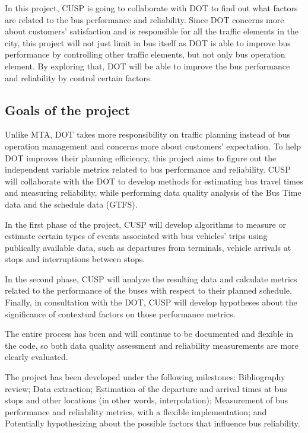 \documentclass[12pt]{report}
\begin{document}
In this project, CUSP is going to collaborate with DOT to find out what factors are related to the bus performance and reliability. Since DOT concerns more about customers' satisfaction and is responsible for all the traffic elements in the city, this project will not just limit in bus itself as DOT is able to improve bus performance by controlling other traffic elements, but not only bus operation element. By exploring that, DOT will be able to improve the bus performance and reliability by control certain factors.

\subsection{Goals of the project}

Unlike MTA, DOT takes more responsibility on traffic planning instead of bus operation management and concerns more about customers' expectation. To help DOT improves their planning efficiency, this project aims to figure out the independent variable metrics related to bus performance and reliability. CUSP will collaborate with the DOT to develop methods for estimating bus travel times and measuring reliability, while performing data quality analysis of the Bus Time data and the schedule data (GTFS). 

In the first phase of the project, CUSP will develop algorithms to measure or estimate certain types of events associated with bus vehicles' trips using publically­ available data, such as departures from terminals, vehicle arrivals at stops and interruptions between stops.  

In the second phase, CUSP will analyze the resulting data and calculate metrics related to the performance of the buses with respect to their planned schedule.  Finally, in consultation with the DOT, CUSP will develop hypotheses about the significance of contextual factors on those performance metrics.

The entire process has been and will continue to be documented and flexible in the code, so both data quality assessment and reliability measurements are more clearly evaluated.

The project has been developed under the following milestones: Bibliography review; Data extraction; Estimation of the departure and arrival times at bus stops and other locations (in other words, interpolation); Measurement of bus performance and reliability metrics, with a flexible implementation; and Potentially hypothesizing about the possible factors that influence bus reliability.
\end{document}
